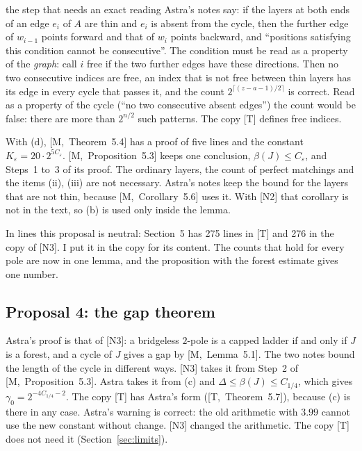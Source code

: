 \documentclass[11pt]{article}
\newcommand{\M}[1]{[M,~#1]}
\newcommand{\T}[1]{[T,~#1]}
\begin{document}
\begin{idea}{the step that needs an exact reading}
Astra's notes say: if the layers at both ends of an edge $e_i$ of $A$ are thin and $e_i$ is
absent from the cycle, then the further edge of $w_{i-1}$ points forward and that of $w_i$
points backward, and ``positions satisfying this condition cannot be consecutive''. The
condition must be read as a property of the \emph{graph}: call $i$ free if the two further edges
have these directions. Then no two consecutive indices are free, an index that is not free
between thin layers has its edge in every cycle that passes it, and the count
$2^{\lceil(z-a-1)/2\rceil}$ is correct. Read as a property of the cycle (``no two consecutive
absent edges'') the count would be false: there are more than $2^{n/2}$ such patterns. The copy
[T] defines free indices.
\end{idea}

With (d), \M{Theorem~5.4} has a proof of five lines and the constant
$K_\varepsilon=20\cdot2^{5C_\varepsilon}$. \M{Proposition~5.3} keeps one conclusion,
$\beta(J)\le C_\varepsilon$, and Steps~1 to~3 of its proof. The ordinary layers, the count of
perfect matchings and the items (ii), (iii) are not necessary. Astra's notes keep the bound for
the layers that are not thin, because \M{Corollary~5.6} uses it. With [N2] that corollary is
not in the text, so (b) is used only inside the lemma.

In lines this proposal is neutral: Section~5 has 275 lines in [T] and 276 in the copy of [N3].
I put it in the copy for its content. The counts that hold for every pole are now in one lemma,
and the proposition with the forest estimate gives one number.

\subsection{Proposal 4: the gap theorem}

Astra's proof is that of [N3]: a bridgeless $2$-pole is a capped ladder if and only if $J$ is a
forest, and a cycle of $J$ gives a gap by \M{Lemma~5.1}. The two notes bound the length of the
cycle in different ways. [N3] takes it from Step~2 of \M{Proposition~5.3}. Astra takes it from
(c) and $\Delta\le\beta(J)\le C_{1/4}$, which gives $\gamma_0=2^{-4C_{1/4}-2}$. The copy [T]
has Astra's form (\T{Theorem~5.7}), because (c) is there in any case. Astra's warning is
correct: the old arithmetic with $3.99$ cannot use the new constant without change. [N3] changed
the arithmetic. The copy [T] does not need it (Section~\ref{sec:limits}).
\end{document}
